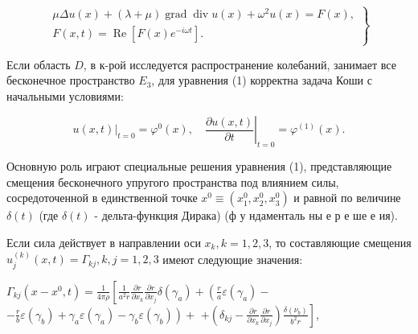 \documentclass[10pt]{article}
\begin{document}
\[

\left.\begin{array}{c}

\mu \Delta u(x)+(\lambda+\mu) \operatorname{grad} \operatorname{div} u(x)+\omega^{2} u(x)=F(x), \\

F(x, t)=\operatorname{Re}\left[F(x) e^{-i \omega t}\right] .

\end{array}\right\}

\]



Если область $D$, в к-рой исследуется распространение колебаний, занимает все бесконечное пространство $E_{3}$, для уравнения (1) корректна задача Коши с начальными условиями:



\[

\left.u(x, t)\right|_{t=0}=\varphi^{0}(x),\left.\quad \frac{\partial u(x, t)}{\partial t}\right|_{t=0}=\varphi^{(1)}(x) .

\]



Основную роль играют специальные решения уравнения (1), представляющие смещения бесконечного упругого пространства под влиянием силы, сосредоточенной в единственной точке $x^{0} \equiv\left(x_{1}^{0}, x_{2}^{0}, x_{3}^{0}\right)$ и равной по величине $\delta(t)$ (где $\delta(t)$ - дельта-функция Дирака) (ф у ндаменталь ны е р е ше е ия).



Если сила действует в направлении оси $x_{k}, k=1,2,3$, то составляющие смещения $u_{j}^{(k)}(x, t)=\Gamma_{k j}, k, j=1,2,3$ имеют следующие значения:



$\Gamma_{k j}\left(x-x^{0}, t\right)=\frac{1}{4 \pi \rho}\left[\frac{1}{a^{2} r} \frac{\partial r}{\partial x_{k}} \frac{\partial r}{\partial x_{j}} \delta\left(\gamma_{a}\right)+\left(\frac{r}{a} \varepsilon\left(\gamma_{a}\right)-\right.\right.$ $\left.-\frac{r}{b} \varepsilon\left(\gamma_{b}\right)+\gamma_{a} \varepsilon\left(\gamma_{a}\right)-\gamma_{b} \varepsilon\left(\gamma_{b}\right)\right)+$ $\left.+\left(\delta_{k j}-\frac{\partial r}{\partial x_{k}} \frac{\partial r}{\partial x_{j}}\right) \frac{\delta\left(\nu_{b}\right)}{b^{2} r}\right]$,
\end{document}
